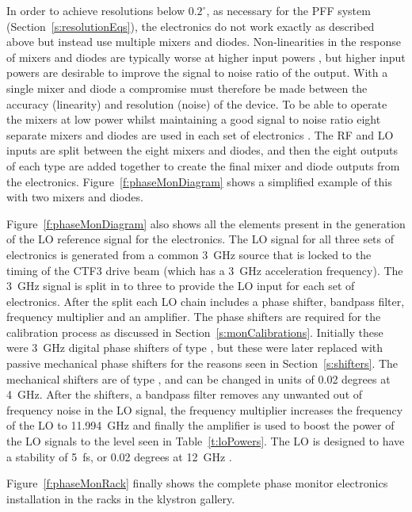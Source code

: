 In order to achieve resolutions below \(0.2^\circ\), as necessary for the PFF system (Section~\ref{s:resolutionEqs}), the electronics do not work exactly as described above but instead use multiple mixers and diodes. Non-linearities in the response of mixers and diodes are typically worse at higher input powers \cite{alex09}, but higher input powers are desirable to improve the signal to noise ratio of the output. With a single mixer and diode a compromise must therefore be made between the accuracy (linearity) and resolution (noise) of the device. To be able to operate the mixers at low power whilst maintaining a good signal to noise ratio eight separate mixers and diodes are used in each set of electronics \cite{alex09}. The RF and LO inputs are split between the eight mixers and diodes, and then the eight outputs of each type are added together to create the final mixer and diode outputs from the electronics. Figure~\ref{f:phaseMonDiagram} shows a simplified example of this with two mixers and diodes.

Figure~\ref{f:phaseMonDiagram} also shows all the elements present in the generation of the LO reference signal for the electronics. The LO signal for all three sets of electronics is generated from a common 3~GHz source that is locked to the timing of the CTF3 drive beam (which has a 3~GHz acceleration frequency). The 3~GHz signal is split in to three to provide the LO input for each set of electronics. After the split each LO chain includes a phase shifter, bandpass filter, frequency multiplier and an amplifier. The phase shifters are required for the calibration process as discussed in Section~\ref{s:monCalibrations}. Initially these were 3~GHz digital phase shifters of type \cite{reyShifters}, but these were later replaced with passive mechanical phase shifters for the reasons seen in Section~\ref{s:shifters}. The mechanical shifters are of type \cite{mechPhShift}, and can be changed in units of 0.02 degrees at 4~GHz. After the shifters, a bandpass filter \cite{klFilter} removes any unwanted out of frequency noise in the LO signal, the frequency multiplier \cite{freqMulti} increases the frequency of the LO to 11.994~GHz and finally the amplifier \cite{amp12GHz} is used to boost the power of the LO signals to the level seen in Table~\ref{t:loPowers}. The LO is designed to have a stability of 5~fs, or 0.02 degrees at 12~GHz \cite{alex09}.

Figure~\ref{f:phaseMonRack} finally shows the complete phase monitor electronics installation in the racks in the klystron gallery.

